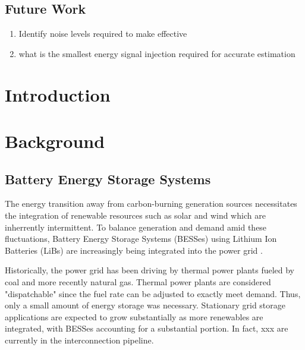 \subsection{Future Work}
\begin{enumerate}
    \item Identify noise levels required to make effective
    \item what is the smallest energy signal injection required for accurate estimation
\end{enumerate}




\section{Introduction}





\section{Background}

\subsection{Battery Energy Storage Systems}

The energy transition away from carbon-burning generation sources necessitates
the integration of renewable resources such as solar and wind which are inherrently
intermittent.  To balance generation and demand amid these fluctuations, Battery Energy Storage 
Systems (BESSes) using Lithium Ion Batteries (LiBs) are increasingly being integrated into the power grid \cite{noauthor_battery_2015}.

Historically, the power grid has been driving by thermal power plants fueled by coal and more recently natural gas.
Thermal power plants are considered "dispatchable" since the fuel rate can be adjusted to exactly meet demand.
Thus, only a small amount of energy storage was necessary. Stationary grid storage applications are expected to grow substantially as more renewables are integrated,
with BESSes accounting for a substantial portion. In fact, xxx are currently in the interconnection pipeline.

